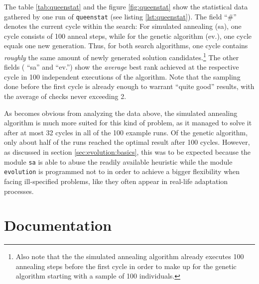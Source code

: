 \begin{appendices}
The table \ref{tab:queenstat} and the figure \ref{fig:queenstat} show the statistical data gathered by one run of \texttt{queenstat} (see listing \ref{lst:queenstat}). The field ``\#'' denotes the current cycle within the search: For simulated annealing (sa), one cycle consists of 100 anneal steps, while for the genetic algorithm (ev.), one cycle equals one new generation. Thus, for both search algorithms, one cycle contains \emph{roughly} the same amount of newly generated solution candidates.\footnote{Also note that the the simulated annealing algorithm already executes 100 annealing steps before the first cycle in order to make up for the genetic algorithm starting with a sample of 100 individuals.} The other fields ( ``sa'' and ``ev.'') show the \emph{average} best rank achieved at the respective cycle in 100 independent executions of the algorithm. Note that the sampling done before the first cycle is already enough to warrant ``quite good'' results, with the average of checks never exceeding 2.

As becomes obvious from analyzing the data above, the simulated annealing algorithm is much more suited for this kind of problem, as it managed to solve it after at most 32 cycles in all of the 100 example runs. Of the genetic algorithm, only about half of the runs reached the optimal result after 100 cycles. However, as discussed in section \ref{sec:evolution:basics}, this was to be expected because the module \texttt{sa} is able to abuse the readily available heuristic while the module \texttt{evolution} is programmed not to in order to achieve a bigger flexibility when facing ill-specified problems, like they often appear in real-life adaptation processes.

\chapter{Documentation}


\begin{comment}
\chapter{A quick guide to Lua's oddities}
\end{comment}

\end{appendices}